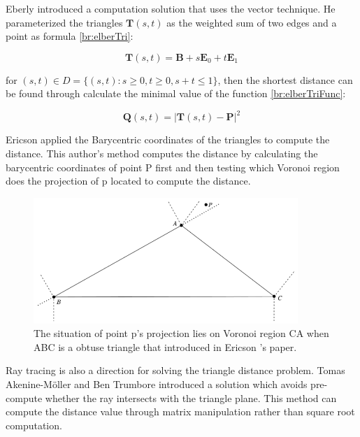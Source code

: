 \hspace*{\fill}

Eberly \cite{eberly2008distance} introduced a computation solution that uses the vector technique. He parameterized the triangles $ \mathbf{T}(s, t) $ as the weighted sum of two edges and a point as formula \ref{br:elberTri}:

\begin{equation}
    \mathbf{T}(s, t)=\mathbf{B}+s \mathbf{E}_{0}+t \mathbf{E}_{1}
    \label{br:elberTri}
\end{equation}

for $(s, t) \in D=\{(s, t): s \geq 0, t \geq 0, s+t \leq 1\}$, then the shortest distance can be found through calculate the minimal value of the function \ref{br:elberTriFunc}:

\begin{equation}
    \mathbf{Q}(s, t)=|\mathbf{T}(s, t)-\mathbf{P}|^{2}
    \label{br:elberTriFunc}
\end{equation}

Ericson \cite{ericson2004real} applied the Barycentric coordinates of the triangles to compute the distance. This author's method computes the distance by calculating the barycentric coordinates of point P first and then testing which Voronoi region does the projection of p located to compute the distance.

\begin{figure}[htbp]
    \centering
    \includegraphics[width=10cm]{Images/Chap2/Barycentric.png}
    \caption{The situation of point p's projection lies on Voronoi region CA when ABC is a obtuse triangle that introduced in Ericson \cite{ericson2004real}'s paper.}
\end{figure}

Ray tracing is also a direction for solving the triangle distance problem. Tomas Akenine-M{\"o}ller and Ben Trumbore \cite{AkenineMller2005FastMS} introduced a solution which avoids pre-compute whether the ray intersects with the triangle plane. This method can compute the distance value through matrix manipulation rather than square root computation.

